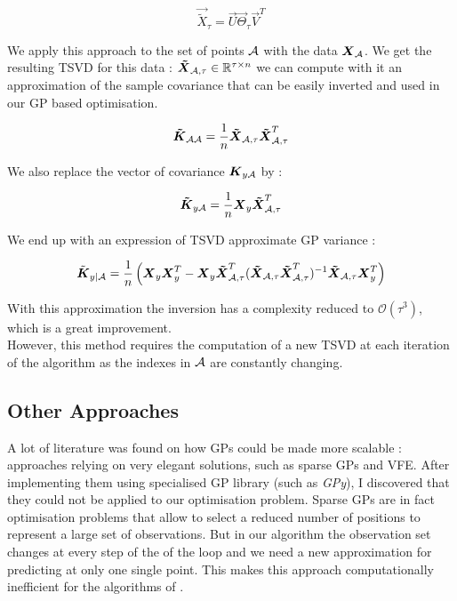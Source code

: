 \begin{equation}
	\vec{\tilde{X}}_\tau = \vec{U} \vec{\Theta}_\tau \vec{V}^T
\end{equation}


We apply this approach to the set of points $\mathcal{A}$ with the data ${\boldsymbol{{X}}}_{\mathcal{A}}$. We get the resulting TSVD for this data : ${\boldsymbol{{\tilde{X}}}}_{\mathcal{A},\tau} \in \mathbb{R}^{\tau \times n}$ we can compute with it an approximation of the sample covariance that can be easily inverted and used in our GP based optimisation.

\begin{equation}
	{\boldsymbol{{\tilde{K}}}}_{\mathcal{A}\mathcal{A}} = \frac{1}{n}{\boldsymbol{{\tilde{X}}}}_{\mathcal{A},\tau}  {\boldsymbol{{\tilde{X}}}}_{\mathcal{A},\tau}^T
\end{equation}

We also replace the vector of covariance ${\boldsymbol{{K}}}_{y\mathcal{A}}$ by : 

\begin{equation}
	{\boldsymbol{{\tilde{K}}}}_{y\mathcal{A}} =  \frac{1}{n}{\boldsymbol{{X}}}_{y} {\boldsymbol{{\tilde{X}}}}_{\mathcal{A},\tau}^T
\end{equation}

We end up with an expression of TSVD approximate GP variance : 

\begin{equation}
	\tilde{{\boldsymbol{{K}}}}_{y | \mathcal{A}} =  \frac{1}{n} \left( {\boldsymbol{{X}}}_{y}{\boldsymbol{{X}}}_{y}^T - {\boldsymbol{{X}}}_{y} {\boldsymbol{{\tilde{X}}}}_{\mathcal{A},\tau}^T ({\boldsymbol{{\tilde{X}}}}_{\mathcal{A},\tau}  {\boldsymbol{{\tilde{X}}}}_{\mathcal{A},\tau}^T)^{-1}  {\boldsymbol{{\tilde{X}}}}_{\mathcal{A},\tau} {\boldsymbol{{X}}}_{y}^T \right)
\end{equation}

With this approximation the inversion has a complexity reduced to $\mathcal{O}(\tau^3)$, which is a great improvement. \\

 However, this method requires the computation of a new TSVD at each iteration of the algorithm as the indexes in $\mathcal{A}$ are constantly changing. 
 


\subsection{Other Approaches}

A lot of literature was found on how GPs could be made more scalable : approaches relying on very elegant solutions, such as sparse GPs and VFE. After implementing them using specialised GP library (such as \textit{GPy}), I discovered that they could not be applied to our optimisation problem. Sparse GPs are in fact optimisation problems that allow to select a reduced number of positions to represent a large set of observations. But in our algorithm the observation set changes at every step of the of the loop and we need a new approximation for predicting at only one single point. This makes this approach computationally inefficient for the algorithms of \citet{krause_near-optimal_2008}. \\



